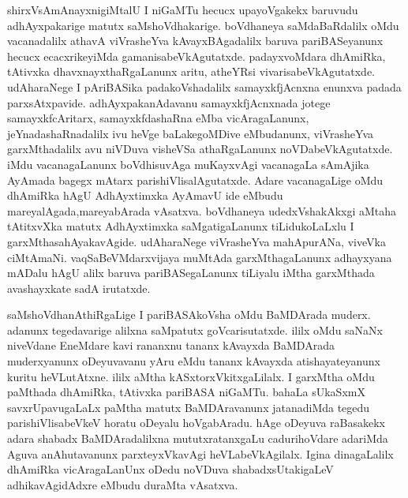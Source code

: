 shirxVsAmAnayxnigiMtalU I niGaMTu hecucx upayoVgakekx baruvudu adhAyxpakarige matutx saMshoVdhakarige. boVdhaneya saMdaBaR\-dalilx oMdu vacanadalilx athavA viVrasheYva kAvayxBAgadalilx baruva pariBASeyanunx hecucx ecacxrikeyiMda gamanisa\-beVkAgutatxde. padayxvoMdara dhAmiRka, tAtivxka dhavxnayxthaRgaLanunx aritu, atheYRsi vivarisabeVkAgutatxde. udAharaNege I pAriBASika padakoVshadalilx samayxkfjAcnxna enunxva padada parxsAtxpavide. adhAyxpakanAdavanu samayxkfjAcnxnada jotege samayxkfcAritarx, samayxkfdashaRna eMba vicAragaLanunx, jeYnadashaRnadalilx ivu heVge baLakegoMDive eMbudanunx, viVrasheYva garxMthadalilx avu niVDuva visheVSa athaR\-gaLanunx noVDabeVkAgutatxde. iMdu vacanagaLanunx boVdhisuvAga muKayxvAgi vacanagaLa sAmAjika AyAmada bagegx mAtarx pari\-shiVlisalAgutatxde. Adare vacanagaLige oMdu dhAmiRka hAgU AdhAyxtimxka AyAmavU ide eMbudu mareyalAgada,\break mareyabArada vAsatxva. boVdhaneya udedxVshakAkxgi aMtaha tAtitxvXka matutx AdhAyxtimxka saMgatigaLanunx tiLidukoLaLxlu I garxMtha\break sahAyakavAgide. udAharaNege viVrasheYva mahApurANa, viveVka ciMtAmaNi. vaqSaBeVMdarxvijaya muMtAda garxMthagaLanunx adhayxyana mADalu hAgU alilx baruva pariBASegaLanunx tiLiyalu iMtha garxMthada avashayxkate sadA irutatxde.

saMshoVdhanAthiRgaLige I pariBASAkoVsha oMdu BaMDArada muderx. adanunx tegedavarige alilxna saMpatutx goVcarisutatxde. ililx oMdu saNaNx niveVdane EneMdare kavi rananxnu tananx kAvayxda BaMDArada muderxyanunx oDeyuvavanu yAru eMdu tananx kAvayxda atishayateyanunx kuritu heVLutAtxne. ililx aMtha kASxtorxVkitxgaLilalx. I garxMtha oMdu paMthada dhAmiRka, tAtivxka pariBASA niGaMTu. bahaLa sUkaSxmX savxrUpavugaLaLx paMtha matutx BaMDAravanunx jatanadiMda tegedu parishiVlisabeVkeV horatu oDeyalu hoVgabAradu. hAge oDeyuva raBasakekx adara shabadx BaMDAradalilxna mututxratanxgaLu cadurihoVdare adariMda Aguva anAhutavanunx parxteyxVkavAgi heVLabeVkAgilalx. Igina dinagaLalilx dhAmiRka vicAragaLanUnx oDedu noVDuva shabadxsUtakigaLeV adhikavAgidAdxre eMbudu duraMta vAsatxva.


